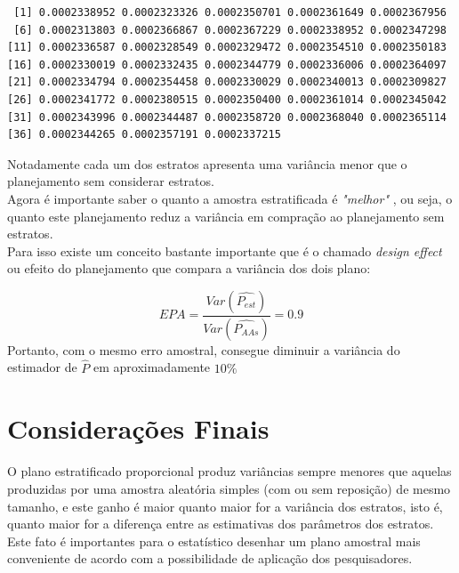 \documentclass[12pt]{article}\usepackage[]{graphicx}\usepackage[]{color}
\makeatletter
\newenvironment{kframe}{%
 \def\at@end@of@kframe{}%
 \ifinner\ifhmode%
  \def\at@end@of@kframe{\end{minipage}}%
  \begin{minipage}{\columnwidth}%
 \fi\fi%
 \def\FrameCommand##1{\hskip\@totalleftmargin \hskip-\fboxsep
 \colorbox{shadecolor}{##1}\hskip-\fboxsep
     \hskip-\linewidth \hskip-\@totalleftmargin \hskip\columnwidth}%
 \MakeFramed {\advance\hsize-\width
   \@totalleftmargin\z@ \linewidth\hsize
   \@setminipage}}%
 {\par\unskip\endMakeFramed%
 \at@end@of@kframe}
\newenvironment{knitrout}{}{} %
\makeatother
\begin{document}
\begin{knitrout}\footnotesize
{}\color{fgcolor}\begin{kframe}
\begin{verbatim}
 [1] 0.0002338952 0.0002323326 0.0002350701 0.0002361649 0.0002367956
 [6] 0.0002313803 0.0002366867 0.0002367229 0.0002338952 0.0002347298
[11] 0.0002336587 0.0002328549 0.0002329472 0.0002354510 0.0002350183
[16] 0.0002330019 0.0002332435 0.0002344779 0.0002336006 0.0002364097
[21] 0.0002334794 0.0002354458 0.0002330029 0.0002340013 0.0002309827
[26] 0.0002341772 0.0002380515 0.0002350400 0.0002361014 0.0002345042
[31] 0.0002343996 0.0002344487 0.0002358720 0.0002368040 0.0002365114
[36] 0.0002344265 0.0002357191 0.0002337215
\end{verbatim}
\end{kframe}
\end{knitrout}



Notadamente cada um dos estratos apresenta uma variância menor
que o planejamento sem considerar estratos.\\
\indent
Agora é importante saber o quanto a amostra estratificada é \textit{"melhor"}
, ou seja, o quanto este planejamento reduz a variância em compração ao
planejamento sem estratos.\\
\indent
Para isso existe um conceito bastante importante que é o chamado
\textit{design effect} ou efeito do planejamento que compara a variância
dos dois plano:



\begin{equation}
  EPA = \frac{Var(\hat{P_{est}})}{Var(\hat{P_{AAs}})} = 0.9
\end{equation}
 Portanto, com o mesmo erro amostral, consegue diminuir a variância
do estimador de $\hat{P}$ em aproximadamente $10\%$


\section{Considerações Finais}
\indent

O plano estratificado proporcional produz variâncias sempre menores que aquelas
produzidas por uma amostra aleatória simples (com ou sem reposição) de mesmo
tamanho, e este ganho é maior quanto maior for a variância dos estratos, isto é,
quanto maior for a diferença entre as estimativas dos parâmetros dos estratos.
Este fato é importantes para o estatístico desenhar um plano amostral mais
conveniente de acordo com a possibilidade de aplicação dos pesquisadores.
\end{document}
